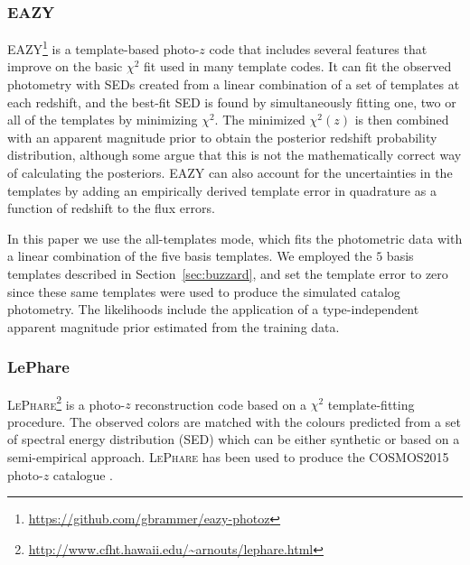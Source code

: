 \subsubsection{EAZY} \label{sec:eazy}

\textsc{EAZY}\footnote{\url{https://github.com/gbrammer/eazy-photoz}} \citep[Easy and Accurate Photometric Redshifts from Yale,][]{Brammer:08} is a template-based photo-$z$ code that includes several features that improve on the basic $\chi^2$ fit used in many template codes. It can fit the observed photometry with SEDs created from a linear combination of a set of templates at each redshift, and the best-fit SED is found by simultaneously fitting one, two or all of the templates by minimizing $\chi^2$. The minimized $\chi^2(z)$ is then combined with an apparent magnitude prior to obtain the posterior redshift probability distribution, although some argue that this is not the mathematically correct way of calculating the posteriors. \textsc{EAZY} can also account for the uncertainties in the templates by adding an empirically derived template error in quadrature as a function of redshift to the flux errors.

In this paper we use the all-templates mode, which fits the photometric data with a linear combination of the five basis templates. We employed the $5$ basis templates described in Section~\ref{sec:buzzard}, and set the template error to zero since these same templates were used to produce the simulated catalog photometry. %
The likelihoods include the application of a type-independent apparent magnitude prior estimated from the training data.

\subsubsection{LePhare}\label{sec:lephare}

\textsc{LePhare}\footnote{\url{http://www.cfht.hawaii.edu/~arnouts/lephare.html}}\citep[Photometric Analysis for Redshift Estimate,][]{Arnouts:99,Ilbert:06} is a photo-$z$ reconstruction code based on a $\chi^2$ template-fitting procedure. The observed colors are matched with the colours predicted from a set of spectral energy distribution (SED) which can be either synthetic or based on a semi-empirical approach. \textsc{LePhare} has been used to produce the COSMOS2015 photo-$z$ catalogue \citep{Laigle:16}.

